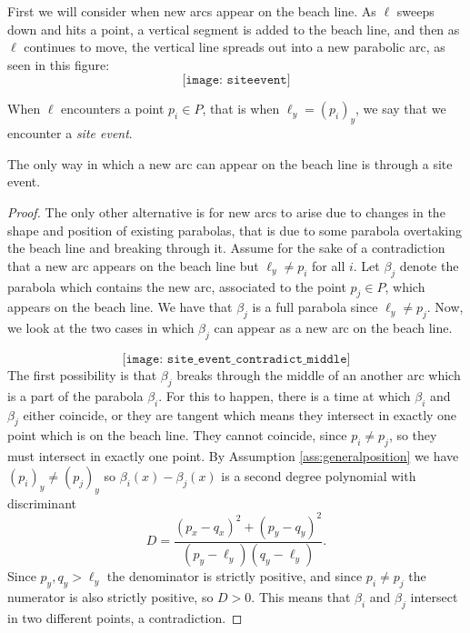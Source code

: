 First we will consider when new arcs appear on the beach line. As $\ell$ sweeps down and hits a point, a vertical segment is added to the beach line, and then as $\ell$ continues to move, the vertical line spreads out into a new parabolic arc, as seen in this figure:
\[
    \texttt{[image: siteevent]} %
\]
\begin{defn}
When $\ell$ encounters a point $p_i \in P$, that is when $\ell_y = (p_i)_y$, we say that we encounter a \emph{site event}.
\end{defn}
\begin{lem} \label{lem:newarciffsiteevent}
The only way in which a new arc can appear on the beach line is through a site event.
\end{lem}
\begin{proof}
The only other alternative is for new arcs to arise due to changes in the shape and position of existing parabolas, that is due to some parabola overtaking the beach line and breaking through it. Assume for the sake of a contradiction that a new arc appears on the beach line but $\ell_y \ne p_i$ for all $i$. Let $\beta_j$ denote the parabola which contains the new arc, associated to the point $p_j \in P$, which appears on the beach line. We have that $\beta_j$ is a full parabola since $\ell_y \ne p_j$. Now, we look at the two cases in which $\beta_j$ can appear as a new arc on the beach line.

\[
    \texttt{[image: site\_event\_contradict\_middle]}
\]
The first possibility is that $\beta_j$ breaks through the middle of an another arc which is a part of the parabola $\beta_i$. For this to happen, there is a time at which $\beta_i$ and $\beta_j$ either coincide, or they are tangent which means they intersect in exactly one point which is on the beach line. They cannot coincide, since $p_i \ne p_j$, so they must intersect in exactly one point. By Assumption \ref{ass:generalposition} we have $(p_i)_y \ne (p_j)_y$ so $\beta_i(x) - \beta_j(x)$ is a second degree polynomial with discriminant
\begin{equation}
    D = \frac{(p_x - q_x)^2 + (p_y - q_y)^2}{(p_y - \ell_y)(q_y - \ell_y)}.
\end{equation}
Since $p_y, q_y > \ell_y$ the denominator is strictly positive, and since $p_i \ne p_j$ the numerator is also strictly positive, so $D > 0$. This means that $\beta_i$ and $\beta_j$ intersect in two different points, a contradiction.


\end{proof}
